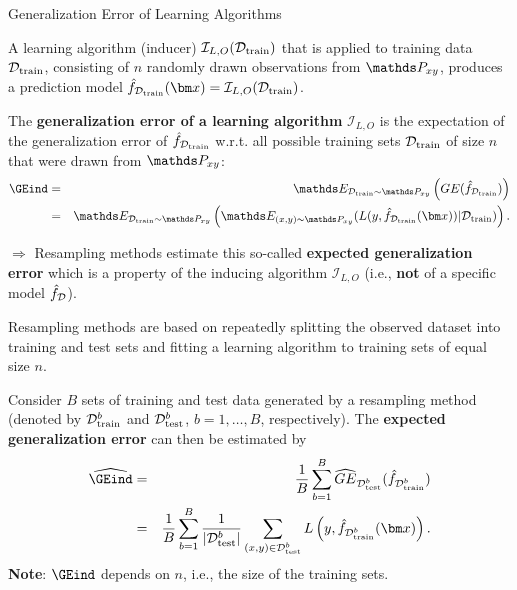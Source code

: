 \begin{vbframe}{Generalization Error of Learning Algorithms}

A learning algorithm (inducer) $\mathcal{I}_{L, O}(\mathcal{D}_{\text{train}})$ that is applied to training data $\mathcal{D}_{\text{train}}$, consisting of $n$ randomly drawn observations from $\Pxy$, produces a prediction model $\fh_{\Dtrain}(\xv) = \mathcal{I}_{L, O}(\Dtrain)$.

\lz

The \textbf{generalization error of a learning algorithm} $\mathcal{I}_{L, O}$ is the expectation of the generalization error of $\hat{f}_{\mathcal{D}_{\text{train}}}$ w.r.t. all possible training sets $\mathcal{D}_{\text{train}}$ of size $n$ that were drawn from $\Pxy$:
\begin{eqnarray*}
\GEind &=& \E_{\Dtrain \sim \Pxy}\left(GE(\fh_{\Dtrain})\right) \\
&=& \E_{\Dtrain \sim \Pxy}\left( \E_{\xy \sim \Pxy}( L(y, \fh_{\Dtrain}(\xv)) | \Dtrain) \right).
\end{eqnarray*}

\lz

$\Rightarrow$ Resampling methods estimate this so-called \textbf{expected generalization error} which is a property of the inducing algorithm $\mathcal{I}_{L, O}$ (i.e., \textbf{not} of a specific model $\hat{f}_{\mathcal{D}}$).

\framebreak

Resampling methods are based on repeatedly splitting the observed dataset into training and test sets and fitting a learning algorithm to training sets of equal size $n$.

\lz

Consider $B$ sets of training and test data generated by a resampling method (denoted by $\mathcal{D}_{\text{train}}^b$ and $\mathcal{D}_{\text{test}}^b$, $b=1,\dots,B$, respectively). The \textbf{expected generalization error} can then be estimated by
\begin{eqnarray*}
\widehat{\GEind} &=&
\frac{1}{B} \sum_{b = 1}^{B} \GEh{\Dtest^b} (\fh_{\Dtrain^b})\\
&=& \frac{1}{B} \sum_{b = 1}^{B} \frac{1}{|\Dtest^b|} \sum_{\xy \in \Dtest^b} L\left(y, \fh_{\Dtrain^b}(\xv)\right).
\end{eqnarray*}
\textbf{Note}: $\GEind$ depends on $n$, i.e., the size of the training sets.

\end{vbframe}

\endlecture


